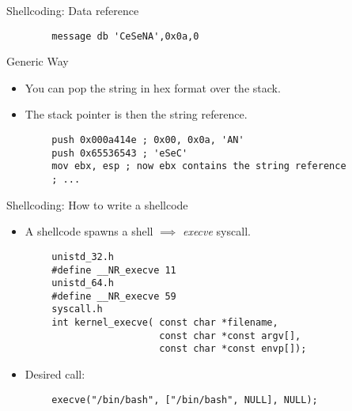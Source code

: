 \begin{frame}{Shellcoding: Data reference}
\begin{lstlisting}
		message	db 'CeSeNA',0x0a,0
	\end{lstlisting}
	\begin{block}{Generic Way}
		\begin{itemize}
			\item You can pop the string in hex format over the stack.
			\item The stack pointer is then the string reference.
		\end{itemize}
	\end{block}
	\acode
	\begin{lstlisting}
		push 0x000a414e ; 0x00, 0x0a, 'AN'
		push 0x65536543 ; 'eSeC'
		mov ebx, esp ; now ebx contains the string reference
		; ...
	\end{lstlisting}
\end{frame}

\begin{frame}[fragile]{Shellcoding: How to write a shellcode}
	\begin{itemize}
		\item A shellcode spawns a shell $\implies$ \emph{execve} syscall.
	\end{itemize}
	\ccode
	\begin{lstlisting}
		unistd_32.h
		#define __NR_execve 11
		unistd_64.h
		#define __NR_execve 59
		syscall.h
		int kernel_execve( const char *filename,
		                   const char *const argv[],
		                   const char *const envp[]);
	\end{lstlisting}
	\begin{itemize}
		\item Desired call:
	\end{itemize}
	\ccode
	\begin{lstlisting}
		execve("/bin/bash", ["/bin/bash", NULL], NULL);
	\end{lstlisting}
\end{frame}

